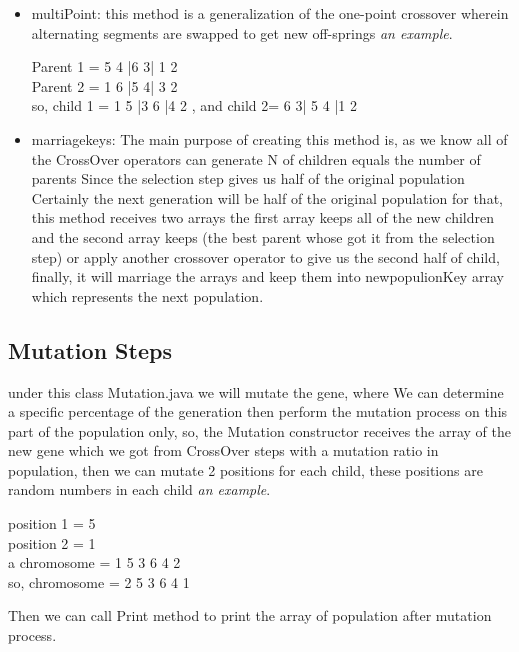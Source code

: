 \begin{itemize}
{    }
    \item{\textsf{multiPoint:} this method is a generalization of the one-point crossover wherein alternating segments are swapped to get new off-springs \textit{an example}.
    \begin{tcolorbox}[breakable,notitle,boxrule=0pt,colback=blue!20,colframe=blue!20]
        { Parent 1 = 5 4 |6 3| 1 2\\ 
          Parent 2 = 1 6 |5 4| 3 2\\
        so, child 1 = 1 5 |3 6 |4 2 , and child 2= 6 3| 5 4 |1 2 }
        \end{tcolorbox}
    }
    \item{\textsf{marriagekeys:} The main purpose of creating this method is, as we know all of the CrossOver operators can generate N of children equals the number of parents Since the selection step gives us half of the original population Certainly the next generation will be half of the original population for that, this method receives two arrays the first array keeps all of the new children and the second array keeps (the best parent whose got it from the selection step) or apply another crossover operator to give us the second half of child, finally, it will marriage the arrays and keep them into newpopulionKey array which represents the next population.}
\end{itemize}
\subsection{Mutation Steps}
under this class Mutation.java we will mutate the gene, where We can determine a specific percentage of the generation then perform the mutation process on this part of the population only, so, the Mutation constructor receives the array of the new gene which we got from CrossOver steps with a mutation ratio in population, then we can mutate 2 positions for each child, these positions are random numbers in each child \textit{an example}.
\begin{tcolorbox}[breakable,notitle,boxrule=0pt,colback=blue!20,colframe=blue!20]
    {position 1 = 5 \\
     position 2 = 1 \\
     a chromosome = \textsf{1} 5 3 6 4 \textsf{2} \\
     so, chromosome = \textsf{2} 5 3 6 4 \textsf{1} }
    \end{tcolorbox}
Then we can call Print method to print the array of population after mutation process.